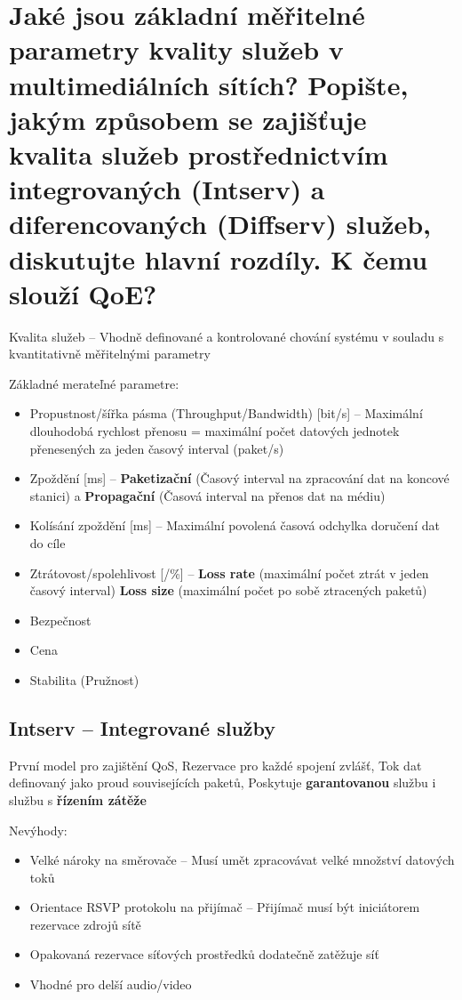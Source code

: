 \section{Jaké jsou základní měřitelné parametry kvality služeb v multimediálních sítích? Popište, jakým způsobem se zajišťuje kvalita služeb prostřednictvím integrovaných (Intserv) a diferencovaných (Diffserv) služeb, diskutujte hlavní rozdíly. K čemu slouží QoE?}

Kvalita služeb -- Vhodně definované a kontrolované chování systému v souladu s kvantitativně měřitelnými parametry

Základné merateľné parametre: 
\begin{itemize}
    \item Propustnost/šířka pásma (Throughput/Bandwidth) [bit/s] -- Maximální dlouhodobá rychlost přenosu = maximální počet datových jednotek přenesených za jeden časový interval (paket/s)
    \item Zpoždění [ms] -- \textbf{Paketizační} (Časový interval na zpracování dat na koncové stanici) a \textbf{Propagační} (Časová interval na přenos dat na médiu)
    \item Kolísání zpoždění [ms] -- Maximální povolená časová odchylka doručení dat do cíle
    \item Ztrátovost/spolehlivost  [/\%] -- \textbf{Loss rate} (maximální počet ztrát v jeden časový interval) \textbf{Loss size} (maximální počet po sobě ztracených paketů)
    \item Bezpečnost
    \item Cena
    \item Stabilita (Pružnost)
\end{itemize}

\subsection{Intserv -- Integrované služby}
První model pro zajištění QoS, Rezervace pro každé spojení zvlášť, Tok dat definovaný jako proud souvisejících paketů, Poskytuje \textbf{garantovanou} službu i službu s \textbf{řízením zátěže}

Nevýhody: 
\begin{itemize}
    \item Velké nároky na směrovače -- Musí umět zpracovávat velké množství datových toků
    \item Orientace RSVP protokolu na přijímač -- Přijímač musí být iniciátorem rezervace zdrojů sítě
    \item Opakovaná rezervace síťových prostředků dodatečně zatěžuje síť
    \item Vhodné pro delší audio/video
\end{itemize}

